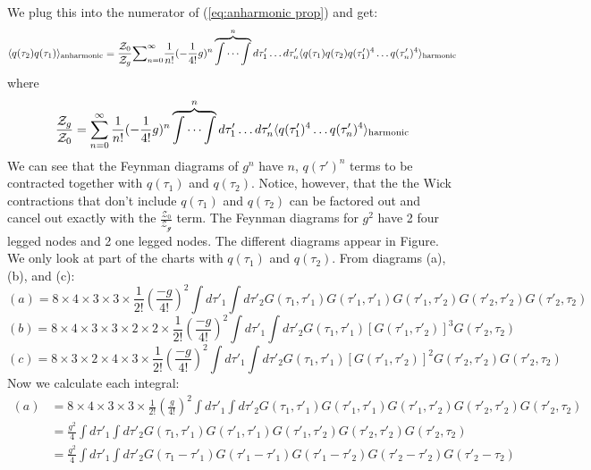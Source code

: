 \documentclass{article}
\begin{document}
We plug this into the numerator of (\ref{eq:anharmonic prop}) and get:
\begin{equation*}
   \langle q(\tau_2)q(\tau_1) \rangle_{\text{anharmonic}} = \frac{\mathcal{Z}_0}{\mathcal{Z}_g}\mathcal  \sum_{n=0}^{\infty}\frac{1}{n!}(-\frac{1}{4!}g)^n\overbrace{\idotsint}^n d\tau_1'\dots d\tau_n' \langle q(\tau_1)q(\tau_2) q(\tau_1')^4\dots q(\tau_n')^4\rangle_{\text{harmonic}} 
\end{equation*}
where
\begin{equation*}
   \frac{\mathcal{Z}_g}{\mathcal{Z}_0} = \sum_{n=0}^{\infty}\frac{1}{n!}(-\frac{1}{4!}g)^n\overbrace{\idotsint}^n d\tau_1'\dots d\tau_n' \langle  q(\tau_1')^4\dots q(\tau_n')^4\rangle_{\text{harmonic}} 
\end{equation*}
We can see that the Feynman diagrams of $g^n$ have $n$, $q(\tau')^n$ terms to be contracted together with $q(\tau_1)$  and $q(\tau_2)$.  Notice, however, that the the Wick contractions that don't include $q(\tau_1)$ and $q(\tau_2)$ can be factored out and cancel out exactly with the $\frac{\mathcal{Z}_0}{\mathcal{Z_g}}$ term. The Feynman diagrams for $g^2$ have 2 four legged nodes and 2 one legged nodes. The different diagrams appear in Figure. We only look at part of the charts with  $q(\tau_1)$ and $q(\tau_2)$. From diagrams (a), (b), and (c):
\begin{equation*}
    (a)=8\times 4\times 3 \times 3 \times \frac{1}{2!}(\frac{-g}{4!})^2\int d\tau'_1\int d\tau'_2 G(\tau_1,\tau'_1)G(\tau'_1,\tau'_1)G(\tau'_1,\tau'_2)G(\tau'_2,\tau'_2)G(\tau'_2,\tau_2)
\end{equation*}
\begin{equation*}
   (b)=8\times 4 \times 3\times 3\times 2 \times 2 \times \frac{1}{2!}(\frac{-g}{4!})^2\int d\tau'_1\int d\tau'_2 G(\tau_1,\tau'_1)[G(\tau'_1,\tau'_2)]^3G(\tau'_2,\tau_2)
\end{equation*}
\begin{equation*}
   (c)=8\times 3 \times 2\times 4\times 3 \times \frac{1}{2!}(\frac{-g}{4!})^2\int d\tau'_1\int d\tau'_2 G(\tau_1,\tau'_1)[G(\tau'_1,\tau'_2)]^2G(\tau'_2,\tau'_2)G(\tau'_2,\tau_2)
\end{equation*}
Now we calculate each integral:
\begin{equation*}
\begin{split}
    (a) &=8\times 4\times 3 \times 3 \times \frac{1}{2!}(\frac{g}{4!})^2\int d\tau'_1\int d\tau'_2 G(\tau_1,\tau'_1)G(\tau'_1,\tau'_1)G(\tau'_1,\tau'_2)G(\tau'_2,\tau'_2)G(\tau'_2,\tau_2)\\
    &=  \frac{g^2}{4}\int d\tau'_1\int d\tau'_2 G(\tau_1,\tau'_1)G(\tau'_1,\tau'_1)G(\tau'_1,\tau'_2)G(\tau'_2,\tau'_2)G(\tau'_2,\tau_2)\\
    &=  \frac{g^2}{4}\int d\tau'_1\int d\tau'_2 G(\tau_1 -\tau'_1)G(\tau'_1-\tau'_1)G(\tau'_1-\tau'_2)G(\tau'_2-\tau'_2)G(\tau'_2-\tau_2)
\end{split}
\end{equation*}
\end{document}
